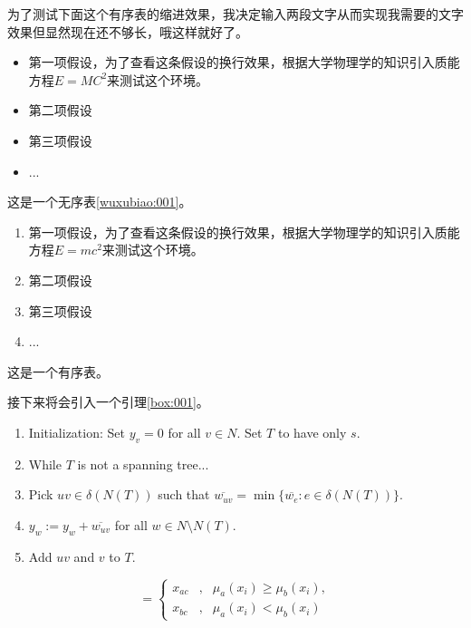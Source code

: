 \documentclass[a4paper,12pt]{ctexart} %
\begin{document}
    为了测试下面这个有序表的缩进效果，我决定输入两段文字从而实现我需要的文字效果但显然现在还不够长，哦这样就好了。


    \begin{itemize}
	   \label{wuxubiao:001}
        \item 第一项假设，为了查看这条假设的换行效果，根据大学物理学的知识引入质能方程$E=MC^2$来测试这个环境。
        \item 第二项假设
        \item 第三项假设
	   \item ...
    \end{itemize}
    
    
    这是一个无序表\ref{wuxubiao:001}。\cite{bib:one}

    \begin{enumerate}
        \item 第一项假设，为了查看这条假设的换行效果，根据大学物理学的知识引入质能方程$E=mc^2$来测试这个环境。
        \item 第二项假设
        \item 第三项假设
	   \item ...
    \end{enumerate}
    
    这是一个有序表。

    
    接下来将会引入一个引理\ref{box:001}。\\


    \begin{mdframed}[style=figstyle] %
        \begin{enumerate}
	   \label{box:001}
            \item \small Initialization: Set $y_v = 0$ for all $v\in N$. Set $T$ to have only $s$.
            \item While $T$ is not a spanning tree...
            \item  \qquad Pick $uv\in \delta(N(T))$ such that $\overline{w_{uv}} = \min \{ \overline{w_e} : e\in \delta(N(T)) \}$.
            \item \qquad $y_w := y_w + \overline{w_{uv}}$ for all $w\in N\setminus N(T)$.
            \item \qquad Add $uv$ and $v$ to $T$.
        \end{enumerate}
    \end{mdframed}

    \begin{equation}
        [x_{i}] = \left\{ 
        \begin{aligned}
            x_{ac} &,& \mu_{a}(x_{i}) \geqslant \mu_{b}(x_{i}), \\
            x_{bc} &,& \mu_{a}(x_{i}) < \mu_{b}(x_{i})
        \end{aligned}
	   \right.
    \end{equation}
\end{document}
